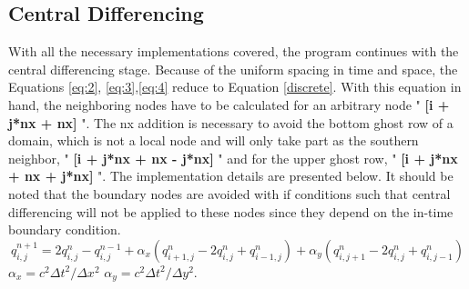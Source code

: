 \documentclass[12pt]{article}
\begin{document}
\subsection{Central Differencing}
With all the necessary implementations covered, the program continues with the central differencing stage. Because of the uniform spacing in time and space, the Equations \ref{eq:2}, \ref{eq:3},\ref{eq:4} reduce to Equation \ref{discrete}. With this equation in hand, the neighboring nodes have to be calculated for an arbitrary node " \textbf{[i + j*nx + nx]} ". The nx addition is necessary to avoid the bottom ghost row of a domain, which is not a local node and will only take part as the southern neighbor, " \textbf{[i + j*nx + nx - j*nx] }" and for the upper ghost row, " \textbf{[i + j*nx + nx + j*nx] }". The implementation details are presented below. It should be noted that the boundary nodes are avoided with if conditions such that central differencing will not be applied to these nodes since they depend on the in-time boundary condition.
\begin{equation}
\label{discrete}
q^{n+1}_{i,j} = 2q^n_{i,j} - q^{n-1}_{i,j} + \alpha_x (q^n_{i+1,j} - 2q^n_{i,j} + q^n_{i-1,j}) + \alpha_y (q^n_{i,j+1} - 2q^n_{i,j} + q^n_{i,j-1})
\end{equation}
 $\alpha_x = c^2\Delta t^2 / \Delta x^2$  $\alpha_y = c^2\Delta t^2 / \Delta y^2$.
\noindent
\end{document}
